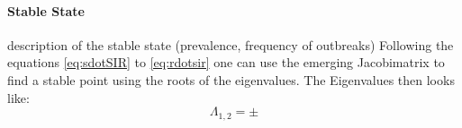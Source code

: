 \paragraph{Stable State}
description of the stable state (prevalence, frequency of outbreaks)
Following the equations \ref{eq:sdotSIR} to \ref{eq:rdotsir} one can use the emerging Jacobimatrix to find a stable point using the roots of the eigenvalues. The Eigenvalues then looks like:
\begin{equation}
\Lambda_{1,2} = \pm 
\end{equation}
